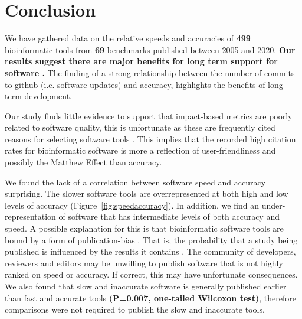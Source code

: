 \documentclass[fleqn,10pt]{SelfArx} %
\def\numTools{499}
\def\numBenchmarkPubs{69}
\begin{document}
\section*{Conclusion}

We have gathered data on the relative speeds and accuracies of
\textbf{{\color{red}\numTools~}} bioinformatic tools from
\textbf{{\color{red}\numBenchmarkPubs}} benchmarks published between
2005 and 2020. {\bf Our results suggest there are major benefits for
  long term support for software \cite{siepel2019challenges}.} The
finding of a strong relationship between the number of commits to
github (i.e. software updates) and accuracy, highlights the benefits of
long-term development.

Our study finds little evidence to support that impact-based metrics
are poorly related to software quality, this is unfortunate as these
are frequently cited reasons for selecting software tools
\cite{Loman2015-bw}. This implies that the recorded high citation
rates for bioinformatic software
\cite{Perez-Iratxeta2007-lv,Van_Noorden2014-kc,Wren2016-xy} is more a
reflection of user-friendliness and possibly the Matthew Effect
\cite{Lariviere2010-kx,Merton1968-cb} than accuracy.

We found the lack of a correlation between software speed and accuracy
surprising.  The slower software tools are overrepresented at both
high and low levels of accuracy (Figure~\ref{fig:speedaccuracy}).
In addition, we find an under-representation of software that has
intermediate levels of both accuracy and speed. A possible explanation
for this is that bioinformatic software tools are bound by a form of
publication-bias \cite{Boulesteix2015-am,Nissen:2016}. That is, the
probability that a study being published is influenced by the results
it contains \cite{sterling1959publication}. The community of
developers, reviewers and editors may be unwilling to publish software
that is not highly ranked on speed or accuracy. If correct, this may
have unfortunate consequences.  We also found that slow and inaccurate
software is generally published earlier than fast and accurate tools
\textbf{{\color{red}(P=0.007, one-tailed Wilcoxon test)}}, therefore
comparisons were not required to publish the slow and
inaccurate tools.

\end{document}
